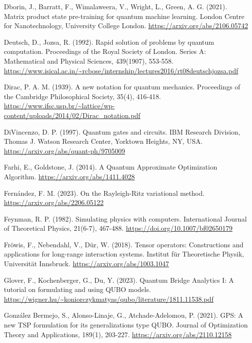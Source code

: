 \begin{thebibliography}{a}
Dborin, J., Barratt, F., Wimalaweera, V., Wright, L., Green, A. G. (2021). Matrix product state pre-training for quantum machine learning. London Centre for Nanotechnology, University College London.
\url{https://arxiv.org/abs/2106.05742}

Deutsch, D., Jozsa, R. (1992). Rapid solution of problems by quantum computation. Proceedings of the Royal Society of London. Series A: Mathematical and Physical Sciences, 439(1907), 553-558.
\url{https://www.isical.ac.in/~rcbose/internship/lectures2016/rt08deutschjozsa.pdf}

Dirac, P. A. M. (1939). A new notation for quantum mechanics. Proceedings of the Cambridge Philosophical Society, 35(4), 416-418. \url{https://www.ifsc.usp.br/~lattice/wp-content/uploads/2014/02/Dirac_notation.pdf}

DiVincenzo, D. P. (1997). Quantum gates and circuits. IBM Research Division, Thomas J. Watson Research Center, Yorktown Heights, NY, USA.
\url{https://arxiv.org/abs/quant-ph/9705009}

Farhi, E., Goldstone, J. (2014). A Quantum Approximate Optimization Algorithm. \url{https://arxiv.org/abs/1411.4028}

Fernández, F. M. (2023). On the Rayleigh-Ritz variational method.
\url{https://arxiv.org/abs/2206.05122}

Feynman, R. P. (1982). Simulating physics with computers. International Journal of Theoretical Physics, 21(6-7), 467-488. \url{https://doi.org/10.1007/bf02650179}

Fröwis, F., Nebendahl, V., Dür, W. (2018). Tensor operators: Constructions and applications for long-range interaction systems. Institut für Theoretische Physik, Universität Innsbruck.
\url{https://arxiv.org/abs/1003.1047}

Glover, F., Kochenberger, G., Du, Y. (2023). Quantum Bridge Analytics I: A tutorial on formulating and using QUBO models.
\url{https://wigner.hu/~koniorczykmatyas/qubo/literature/1811.11538.pdf}

González Bermejo, S., Alonso-Linaje, G., Atchade-Adelomou, P. (2021). GPS: A new TSP formulation for its generalizations type QUBO. Journal of Optimization Theory and Applications, 189(1), 203-227.
\url{https://arxiv.org/abs/2110.12158}


\end{thebibliography}
